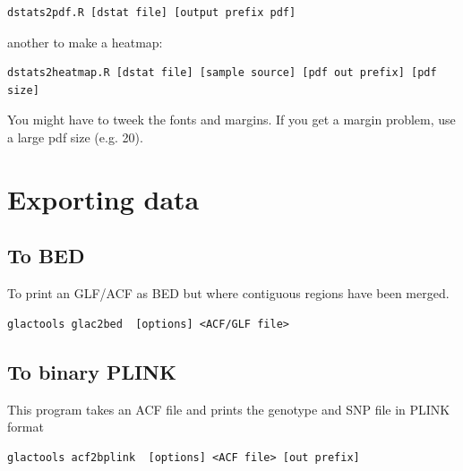 \documentclass[a4paper]{article}
\begin{document}
\begin{lstlisting}
dstats2pdf.R [dstat file] [output prefix pdf]
\end{lstlisting}

another to make a heatmap:
\begin{lstlisting}
dstats2heatmap.R [dstat file] [sample source] [pdf out prefix] [pdf size]
\end{lstlisting}

You might have to tweek the fonts and margins. If you get a margin problem, use a large pdf size (e.g. 20).












\newpage

\section{Exporting data}
\subsection{To BED}

To print an GLF/ACF as BED but where contiguous regions have been merged.
\begin{lstlisting}
glactools glac2bed  [options] <ACF/GLF file>
\end{lstlisting}


\subsection{To binary PLINK}

\noindent This program takes an ACF file and prints the genotype and SNP file in PLINK format

\tiny
\begin{lstlisting}
glactools acf2bplink  [options] <ACF file> [out prefix]
\end{lstlisting}
\normalsize
\end{document}
